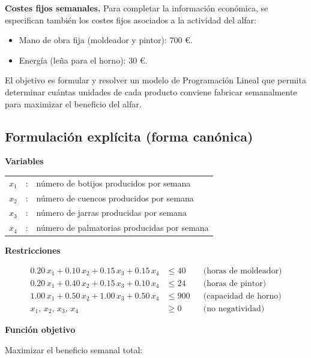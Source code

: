 \textbf{Costes fijos semanales.}
Para completar la información económica, se especifican también los costes fijos asociados a la actividad del alfar:



\begin{itemize}

\item Mano de obra fija (moldeador y pintor): 700 €.

\item Energía (leña para el horno): 30 €.

\end{itemize}



El objetivo es formular y resolver un modelo de Programación Lineal que permita determinar cuántas unidades de cada producto conviene fabricar semanalmente para maximizar el beneficio del alfar.

\subsection{Formulación explícita (forma canónica)}

\textbf{Variables}

\begin{tabular}{l c l}
    $x_1$ & : & número de botijos producidos por semana \\
    $x_2$ & : & número de cuencos producidos por semana \\
    $x_3$ & : & número de jarras producidas por semana \\
    $x_4$ & : & número de palmatorias producidas por semana \\
\end{tabular}

\textbf{Restricciones}

\begin{align}
0.20\,x_1 + 0.10\,x_2 + 0.15\,x_3 + 0.15\,x_4 & \leq 40 
&& \text{(horas de moldeador)} \\[0.5em]
0.20\,x_1 + 0.40\,x_2 + 0.15\,x_3 + 0.10\,x_4 & \leq 24 
&& \text{(horas de pintor)} \\[0.5em]
1.00\,x_1 + 0.50\,x_2 + 1.00\,x_3 + 0.50\,x_4 & \leq 900 
&& \text{(capacidad de horno)} \\[0.5em]
x_1,\,x_2,\,x_3,\,x_4 & \geq 0 
&& \text{(no negatividad)}
\end{align}


\textbf{Función objetivo}

Maximizar el beneficio semanal total:

